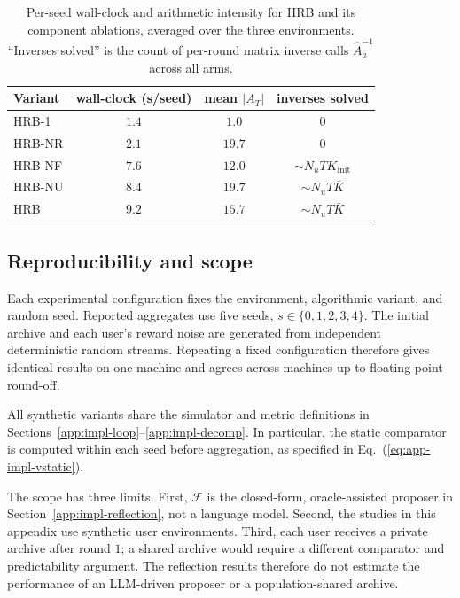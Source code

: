 \documentclass{article} %
\renewcommand{\eqref}[1]{\textup{(\ref{#1})}}
\begin{document}
\begin{table}[h]
\centering
\small
\caption{Per-seed wall-clock and arithmetic intensity for HRB and its component ablations, averaged over the three environments. ``Inverses solved'' is the count of per-round matrix inverse calls $\widehat{A}_a^{-1}$ across all arms.}
\label{tab:app-impl-runtime}
\begin{tabular}{lccc}
\toprule
Variant & wall-clock (s/seed) & mean $|A_T|$ & inverses solved \\
\midrule
\textnormal{HRB-1}        & $1.4$ & $1.0$  & $0$ \\
\textnormal{HRB-NR}        & $2.1$ & $19.7$ & $0$ \\
\textnormal{HRB-NF}     & $7.6$ & $12.0$ & $\sim N_u T K_{\text{init}}$ \\
\textnormal{HRB-NU}& $8.4$ & $19.7$ & $\sim N_u T \bar K$ \\
\textnormal{HRB}               & $9.2$ & $15.7$ & $\sim N_u T \bar K$ \\
\bottomrule
\end{tabular}

\end{table}

\subsection{Reproducibility and scope}

\label{app:impl-repro}
\label{app:impl-not-included}

Each experimental configuration fixes the environment, algorithmic variant,
and random seed. Reported aggregates use five seeds, \(s\in\{0,1,2,3,4\}\).
The initial archive and each user's reward noise are generated from independent
deterministic random streams. Repeating a fixed configuration therefore gives
identical results on one machine and agrees across machines up to floating-point
round-off.

All synthetic variants share the simulator and metric definitions in
Sections~\ref{app:impl-loop}--\ref{app:impl-decomp}. In particular, the static
comparator is computed within each seed before aggregation, as specified in
Eq.~\eqref{eq:app-impl-vstatic}.

The scope has three limits. First, \(\mathcal F\) is the closed-form,
oracle-assisted proposer in Section~\ref{app:impl-reflection}, not a language
model. Second, the studies in this appendix use synthetic user environments.
Third, each user receives a private archive after round \(1\); a shared archive
would require a different comparator and predictability argument. The
reflection results therefore do not estimate the performance of an LLM-driven
proposer or a population-shared archive.
\end{document}
